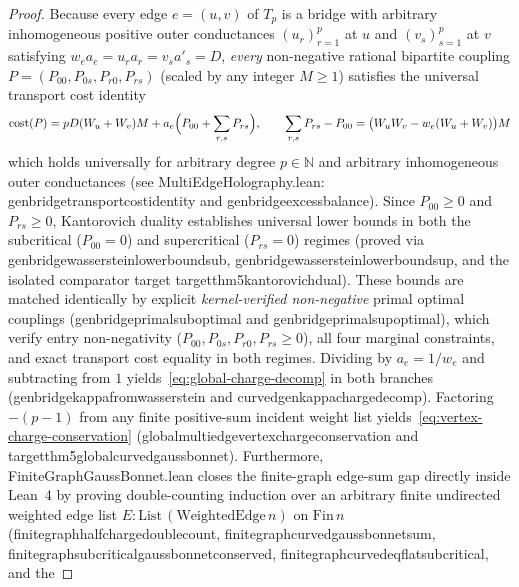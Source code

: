 \documentclass[11pt,a4paper]{article}
\numberwithin{equation}{section}
\theoremstyle{plain}
\theoremstyle{definition}
\theoremstyle{remark}
\newcommand{\N}{\mathbb{N}}
\newcommand{\Tp}{T_p}
\newcommand{\code}[1]{{\ttfamily\footnotesize\def\_{\textunderscore\penalty0\hskip0pt}#1}}
\begin{document}
\begin{proof}
Because every edge $e=(u,v)$ of $\Tp$ is a bridge with arbitrary inhomogeneous positive outer conductances $(u_r)_{r=1}^p$ at $u$ and $(v_s)_{s=1}^p$ at $v$ satisfying $w_e a_e = u_r a_r = v_s a'_s = D$, \emph{every} non-negative rational bipartite coupling $P = (P_{00}, P_{0s}, P_{r0}, P_{rs})$ (scaled by any integer $M \ge 1$) satisfies the universal transport cost identity
\[
  \mathrm{cost}(P) = p D (W_u + W_v) M + a_e\Bigl(P_{00} + \sum_{r,s} P_{rs}\Bigr),
  \qquad
  \sum_{r,s} P_{rs} - P_{00} = \bigl(W_u W_v - w_e(W_u + W_v)\bigr) M
\]
which holds universally for arbitrary degree $p \in \N$ and arbitrary inhomogeneous outer conductances (see \code{MultiEdge\allowbreak Holography.lean}: \code{gen\_\allowbreak bridge\_\allowbreak transport\_\allowbreak cost\_\allowbreak identity} and \code{gen\_\allowbreak bridge\_\allowbreak excess\_\allowbreak balance}). Since $P_{00} \ge 0$ and $P_{rs} \ge 0$, Kantorovich duality establishes universal lower bounds in both the subcritical ($P_{00} = 0$) and supercritical ($P_{rs} = 0$) regimes (proved via \code{gen\_\allowbreak bridge\_\allowbreak wasserstein\_\allowbreak lower\_\allowbreak bound\_\allowbreak sub}, \code{gen\_\allowbreak bridge\_\allowbreak wasserstein\_\allowbreak lower\_\allowbreak bound\_\allowbreak sup}, and the isolated comparator target \code{target\_\allowbreak thm5\_\allowbreak kantorovich\_\allowbreak dual}). These bounds are matched identically by explicit \emph{kernel-verified non-negative} primal optimal couplings (\code{gen\_\allowbreak bridge\_\allowbreak primal\_\allowbreak sub\_\allowbreak optimal} and \code{gen\_\allowbreak bridge\_\allowbreak primal\_\allowbreak sup\_\allowbreak optimal}), which verify entry non-negativity ($P_{00}, P_{0s}, P_{r0}, P_{rs} \ge 0$), all four marginal constraints, and exact transport cost equality in both regimes. Dividing by $a_e = 1/w_e$ and subtracting from $1$ yields~\eqref{eq:global-charge-decomp} in both branches (\code{gen\_\allowbreak bridge\_\allowbreak kappa\_\allowbreak from\_\allowbreak wasserstein} and \code{curved\_\allowbreak gen\_\allowbreak kappa\_\allowbreak charge\_\allowbreak decomp}). Factoring $-(p-1)$ from any finite positive-sum incident weight list yields~\eqref{eq:vertex-charge-conservation} (\code{global\_\allowbreak multi\_\allowbreak edge\_\allowbreak vertex\_\allowbreak charge\_\allowbreak conservation} and \code{target\_\allowbreak thm5\_\allowbreak global\_\allowbreak curved\_\allowbreak gauss\_\allowbreak bonnet}). Furthermore, \code{FiniteGraph\allowbreak GaussBonnet.\allowbreak lean} closes the finite-graph edge-sum gap directly inside Lean~4 by proving double-counting induction over an arbitrary finite undirected weighted edge list $E : \mathrm{List}\,(\mathrm{WeightedEdge}\,n)$ on $\mathrm{Fin}\,n$ (\code{finite\_\allowbreak graph\_\allowbreak half\_\allowbreak charge\_\allowbreak double\_\allowbreak count}, \code{finite\_\allowbreak graph\_\allowbreak curved\_\allowbreak gauss\_\allowbreak bonnet\_\allowbreak sum}, \code{finite\_\allowbreak graph\_\allowbreak subcritical\_\allowbreak gauss\_\allowbreak bonnet\_\allowbreak conserved}, \code{finite\_\allowbreak graph\_\allowbreak curved\_\allowbreak eq\_\allowbreak flat\_\allowbreak subcritical}, and the 
\end{proof}
\end{document}
